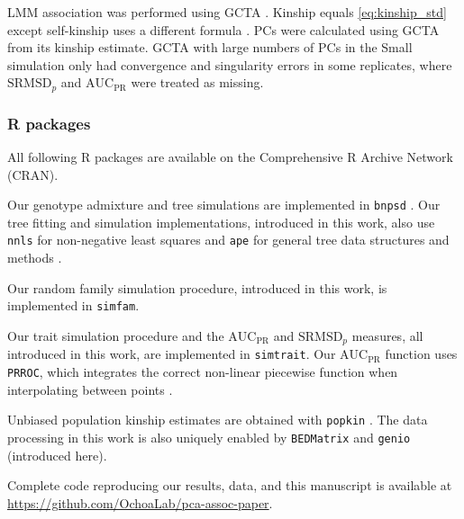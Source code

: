 \documentclass[11pt]{article}
\newcommand{\rmsd}{\text{SRMSD}_p}
\newcommand{\auc}{\text{AUC}_\text{PR}}
\begin{document}
LMM association was performed using GCTA \citep{yang_gcta:_2011}.
Kinship equals \cref{eq:kinship_std} except self-kinship uses a different formula \citep{yang_gcta:_2011}.
PCs were calculated using GCTA from its kinship estimate.
GCTA with large numbers of PCs in the Small simulation only had convergence and singularity errors in some replicates, where $\rmsd$ and $\auc$ were treated as missing.

\subsubsection{R packages}
All following R packages are available on the Comprehensive R Archive Network (CRAN).

Our genotype admixture and tree simulations are implemented in \texttt{bnpsd} \citep{ochoa_estimating_2021}.
Our tree fitting and simulation implementations, introduced in this work, also use \texttt{nnls} for non-negative least squares \citep{mullen_nnls_2012} and \texttt{ape} for general tree data structures and methods \citep{paradis_ape_2019}.

Our random family simulation procedure, introduced in this work, is implemented in \texttt{simfam}.

Our trait simulation procedure and the $\auc$ and $\rmsd$ measures, all introduced in this work, are implemented in \texttt{simtrait}.
Our $\auc$ function uses \texttt{PRROC}, which integrates the correct non-linear piecewise function when interpolating between points \citep{grau_prroc:_2015}.

Unbiased population kinship estimates are obtained with \texttt{popkin} \citep{ochoa_estimating_2021}.
The data processing in this work is also uniquely enabled by \texttt{BEDMatrix} \citep{grueneberg_bgdata_2019} and \texttt{genio} (introduced here).

Complete code reproducing our results, data, and this manuscript is available at \url{https://github.com/OchoaLab/pca-assoc-paper}.


\printbibliography
\end{document}
